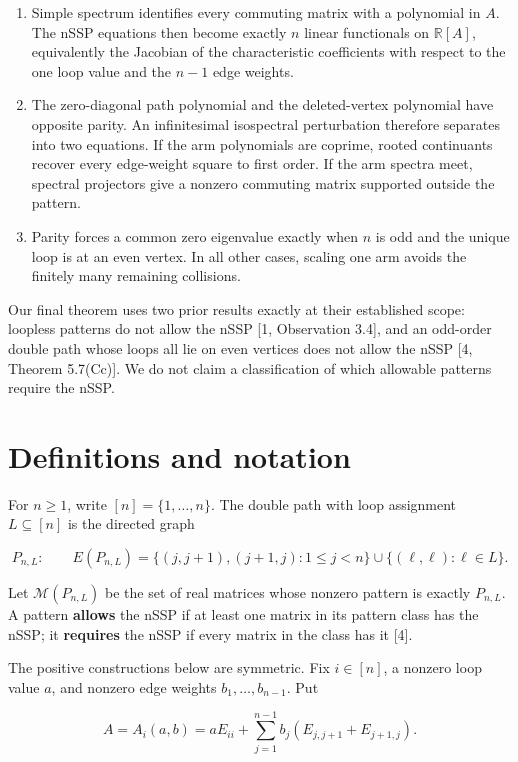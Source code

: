 \documentclass[11pt]{article}
\theoremstyle{remark}
\begin{document}
\begin{enumerate}
\item Simple spectrum identifies every commuting matrix with a polynomial in $A$. The nSSP equations
   then become exactly $n$ linear functionals on $\mathbb R[A]$, equivalently the Jacobian of the
   characteristic coefficients with respect to the one loop value and the $n-1$ edge weights.
\item The zero-diagonal path polynomial and the deleted-vertex polynomial have opposite parity. An
   infinitesimal isospectral perturbation therefore separates into two equations. If the arm polynomials
   are coprime, rooted continuants recover every edge-weight square to first order. If the arm spectra
   meet, spectral projectors give a nonzero commuting matrix supported outside the pattern.
\item Parity forces a common zero eigenvalue exactly when $n$ is odd and the unique loop is at an even
   vertex. In all other cases, scaling one arm avoids the finitely many remaining collisions.
\end{enumerate}
Our final theorem uses two prior results exactly at their established scope: loopless patterns do not
allow the nSSP [1, Observation 3.4], and an odd-order double path whose loops all lie on even vertices
does not allow the nSSP [4, Theorem 5.7(Cc)]. We do not claim a classification of which allowable
patterns require the nSSP.

\section{Definitions and notation}


For $n\geq1$, write $[n]=\{1,\ldots,n\}$. The double path with loop assignment
$L\subseteq[n]$ is the directed graph

\[
  P_{n,L}:\qquad
  E(P_{n,L})=
  \{(j,j+1),(j+1,j):1\leq j<n\}
  \cup\{(\ell,\ell):\ell\in L\}.
\]

Let $\mathcal M(P_{n,L})$ be the set of real matrices whose nonzero pattern is exactly
$P_{n,L}$. A pattern \textbf{allows} the nSSP if at least one matrix in its pattern class has the nSSP; it
\textbf{requires} the nSSP if every matrix in the class has it [4].

The positive constructions below are symmetric. Fix $i\in[n]$, a nonzero loop value $a$, and
nonzero edge weights $b_1,\ldots,b_{n-1}$. Put

\[
  A=A_i(a,b)
  =aE_{ii}+\sum_{j=1}^{n-1}b_j(E_{j,j+1}+E_{j+1,j}).       \tag{2.1}
\]
\end{document}
